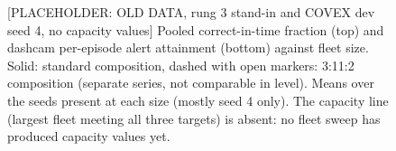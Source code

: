 \documentclass[sigconf]{acmart}
\begin{document}
{\selectfont
\begin{figure}[t]
  \centering
  
  \caption{[PLACEHOLDER: OLD DATA, rung 3 stand-in and COVEX dev seed 4, no capacity values] Pooled correct-in-time fraction (top) and dashcam per-episode alert attainment (bottom) against fleet size. Solid: standard composition, dashed with open markers: 3:11:2 composition (separate series, not comparable in level). Means over the seeds present at each size (mostly seed 4 only). The capacity line (largest fleet meeting all three targets) is absent: no fleet sweep has produced capacity values yet.}
  \label{fig:F09_fleet_load}
\end{figure}
}


\end{document}
